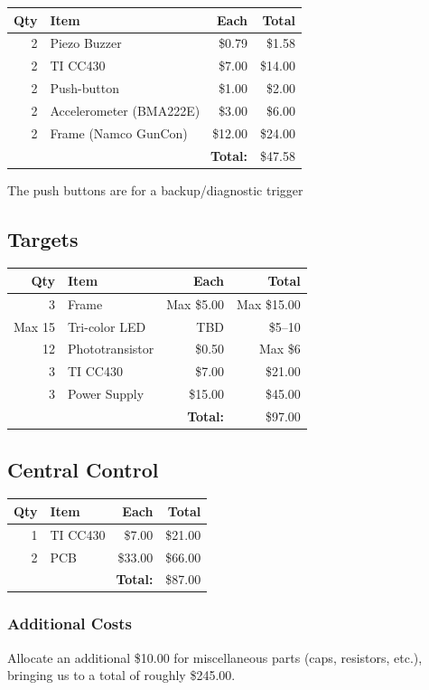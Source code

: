 \documentclass{article}
\begin{document}
\begin{tabular}{|r|l|r|r|}
\hline
\textbf{Qty} & \textbf{Item} & \textbf{Each} & \textbf{Total} \\
\hline
2 & Piezo Buzzer & \$0.79 & \$1.58 \\
\hline
2 & TI CC430 & \$7.00 & \$14.00 \\
\hline
2 & Push-button & \$1.00 & \$2.00 \\
\hline
2 & Accelerometer (BMA222E) & \$3.00 & \$6.00 \\
\hline
2 & Frame (Namco GunCon) & \$12.00 & \$24.00 \\
\hline
\multicolumn{3}{r|}{\textbf{Total:}} & \$47.58 \\
\cline{4-4}
\end{tabular}

The push buttons are for a backup/diagnostic trigger

\subsection{Targets}

\begin{tabular}{|r|l|r|r|}
\hline
\textbf{Qty} & \textbf{Item} & \textbf{Each} & \textbf{Total} \\
\hline
3 & Frame & Max \$5.00 & Max \$15.00 \\
\hline
Max 15 & Tri-color LED & TBD & \$5--10 \\
\hline
12 & Phototransistor & \$0.50 & Max \$6 \\
\hline
3 & TI CC430 & \$7.00 & \$21.00 \\
\hline
3 & Power Supply & \$15.00 & \$45.00 \\
\hline
\multicolumn{3}{r|}{\textbf{Total:}} & \$97.00 \\
\cline{4-4}
\end{tabular}

\subsection{Central Control}

\begin{tabular}{|r|l|r|r|}
\hline
\textbf{Qty} & \textbf{Item} & \textbf{Each} & \textbf{Total} \\
\hline
1 & TI CC430 & \$7.00 & \$21.00 \\
\hline
2 & PCB & \$33.00 & \$66.00 \\
\hline
\multicolumn{3}{r|}{\textbf{Total:}} & \$87.00 \\
\cline{4-4}
\end{tabular}

\subsubsection{Additional Costs}

Allocate an additional \$10.00 for miscellaneous parts (caps, resistors, etc.), bringing us to a total of
roughly \$245.00.
\end{document}
